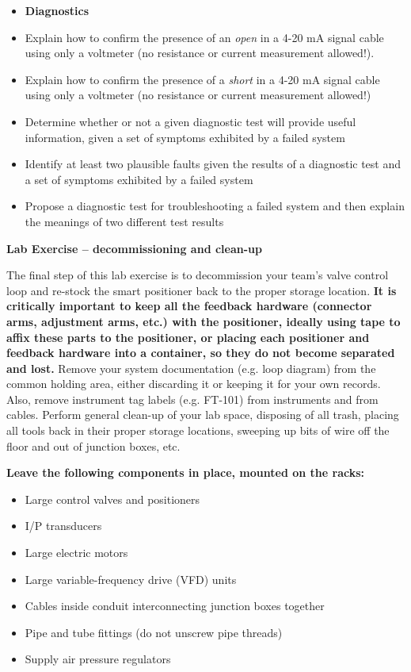 \documentclass[12pt,a4paper]{article}
\begin{document}
\begin{itemize}
\filbreak

\begin{itemize}
\item{} {\bf Diagnostics}
\item{} Explain how to confirm the presence of an {\it open} in a 4-20 mA signal cable using only a voltmeter (no resistance or current measurement allowed!).
\item{} Explain how to confirm the presence of a {\it short} in a 4-20 mA signal cable using only a voltmeter (no resistance or current measurement allowed!)  
\item{} Determine whether or not a given diagnostic test will provide useful information, given a set of symptoms exhibited by a failed system
\item{} Identify at least two plausible faults given the results of a diagnostic test and a set of symptoms exhibited by a failed system
\item{} Propose a diagnostic test for troubleshooting a failed system and then explain the meanings of two different test results
\end{itemize}



\vfil \eject

\noindent
{\bf Lab Exercise -- decommissioning and clean-up}

\vskip 5pt

The final step of this lab exercise is to decommission your team's valve control loop and re-stock the smart positioner back to the proper storage location.  {\bf It is critically important to keep all the feedback hardware (connector arms, adjustment arms, etc.) with the positioner, ideally using tape to affix these parts to the positioner, or placing each positioner and feedback hardware into a container, so they do not become separated and lost.}  Remove your system documentation (e.g. loop diagram) from the common holding area, either discarding it or keeping it for your own records.  Also, remove instrument tag labels (e.g. FT-101) from instruments and from cables.  Perform general clean-up of your lab space, disposing of all trash, placing all tools back in their proper storage locations, sweeping up bits of wire off the floor and out of junction boxes, etc.

\vskip 10pt

\indent
{\bf Leave the following components in place, mounted on the racks:}

\begin{itemize}
\item{} Large control valves and positioners
\item{} I/P transducers
\item{} Large electric motors
\item{} Large variable-frequency drive (VFD) units
\item{} Cables inside conduit interconnecting junction boxes together
\item{} Pipe and tube fittings (do not unscrew pipe threads)
\item{} Supply air pressure regulators
\end{itemize}


\end{itemize}
\end{document}
